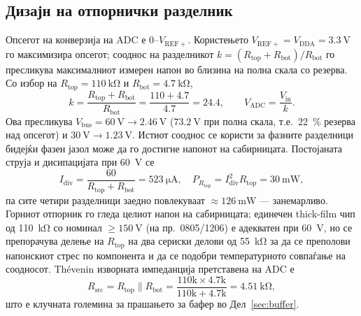 \documentclass[journal,onecolumn,11pt]{IEEEtran}
\newcommand{\Vdcbus}{V_{\mathrm{bus}}}
\begin{document}
\subsection{Дизајн на отпорнички разделник}\label{sec:divider}
Опсегот на конверзија на ADC е \(0\)--\(V_{\mathrm{REF+}}\). Користењето
\(V_{\mathrm{REF+}}=V_{\mathrm{DDA}}=\SI{3.3}{\volt}\) го максимизира опсегот; сооднос на разделникот
\(k=(R_{\mathrm{top}}+R_{\mathrm{bot}})/R_{\mathrm{bot}}\) го пресликува максималниот измерен напон во
близина на полна скала со резерва. Со избор на \(R_{\mathrm{top}}=\SI{110}{\kilo\ohm}\) и
\(R_{\mathrm{bot}}=\SI{4.7}{\kilo\ohm}\),
\begin{equation}
k=\frac{R_{\mathrm{top}}+R_{\mathrm{bot}}}{R_{\mathrm{bot}}}
 =\frac{110+4.7}{4.7}=24.4,\qquad V_{\mathrm{ADC}}=\frac{V_{\mathrm{in}}}{k}.
\end{equation}
Ова пресликува \(\Vdcbus=\SI{60}{\volt}\to\SI{2.46}{\volt}\) (\(\SI{73.2}{\volt}\) при полна скала,
т.е.\ \SI{22}{\percent} резерва над опсегот) и \(\SI{30}{\volt}\to\SI{1.23}{\volt}\). Истиот сооднос се
користи за фазните разделници бидејќи фазен јазол може да го достигне напонот на сабирницата.
Постојаната струја и дисипацијата при \SI{60}{\volt} се
\begin{equation}
I_{\mathrm{div}}=\frac{60}{R_{\mathrm{top}}+R_{\mathrm{bot}}}=\SI{523}{\micro\ampere},\quad
P_{R_{\mathrm{top}}}=I_{\mathrm{div}}^2R_{\mathrm{top}}=\SI{30}{\milli\watt},
\end{equation}
па сите четири разделници заедно повлекуваат \(\approx\SI{126}{\milli\watt}\) --- занемарливо. Горниот
отпорник го гледа целиот напон на сабирницата; единечен thick-film чип од \SI{110}{\kilo\ohm} со
номинал \(\ge\SI{150}{\volt}\) (на пр.\ 0805/1206) е адекватен при \SI{60}{\volt}, но се препорачува
делење на \(R_{\mathrm{top}}\) на два сериски делови од \SI{55}{\kilo\ohm} за да се преполови напонскиот
стрес по компонента и да се подобри температурното совпаѓање на соодносот. Th\'evenin изворната
импеданција претставена на ADC е
\begin{equation}
R_{\mathrm{src}}=R_{\mathrm{top}}\parallel R_{\mathrm{bot}}
   =\frac{110\text{k}\times4.7\text{k}}{110\text{k}+4.7\text{k}}=\SI{4.51}{\kilo\ohm},
\label{eq:rsrc}
\end{equation}
што е клучната големина за прашањето за бафер во Дел~\ref{sec:buffer}.
\end{document}
